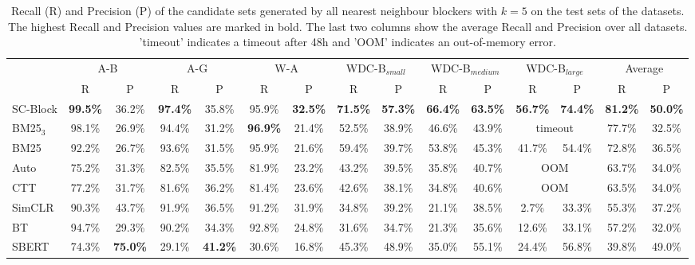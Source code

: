 \documentclass[sigconf,nonacm]{acmart}
\begin{document}
\begin{table*}[]
\caption{Recall (R) and Precision (P) of the candidate sets generated by all nearest neighbour blockers with $k=5$ on the test sets of the datasets. The highest Recall and Precision values are marked in bold. The last two columns show the average Recall and Precision over all datasets. 'timeout' indicates a timeout after 48h and 'OOM' indicates an out-of-memory error.}
\label{tab:nns_fixed_k}
\begin{tabular}{@{}l|cc|cc|cc|cc|cc|cc|cc@{}}
\toprule
  &  \multicolumn{2}{c}{A-B}  &  \multicolumn{2}{c}{A-G}  &  \multicolumn{2}{c}{W-A}  &  \multicolumn{2}{c}{WDC-B$_{small}$}  & \multicolumn{2}{c}{WDC-B$_{medium}$}  & \multicolumn{2}{c}{WDC-B$_{large}$}  &   \multicolumn{2}{c}{Average}\\ 
              &  R      &  P     &  R      &  P     &  R      &  P      &  R      &  P      &  R  &   P &  R  &   P &  R  &   P \\ \midrule
SC-Block & \textbf{99.5\%} & 36.2\% & \textbf{97.4\%} & 35.8\% & 95.9\% & \textbf{32.5\%} & \textbf{71.5\%} & \textbf{57.3\%} & \textbf{66.4\%} & \textbf{63.5\%} & \textbf{56.7\%} & \textbf{74.4\%} & \textbf{81.2\%} & \textbf{50.0\%} \\
BM25$_3$  & 98.1\% & 26.9\% & 94.4\% & 31.2\% & \textbf{96.9\%} & 21.4\% & 52.5\% & 38.9\% & 46.6\% & 43.9\% & \multicolumn{2}{c|}{timeout}   & 77.7\% & 32.5\% \\
BM25     & 92.2\% & 26.7\% & 93.6\% & 31.5\% & 95.9\% & 21.6\% & 59.4\% & 39.7\% & 53.8\% & 45.3\% & 41.7\%               & 54.4\%                  & 72.8\% & 36.5\% \\
Auto     & 75.2\% & 31.3\% & 82.5\% & 35.5\% & 81.9\% & 23.2\% & 43.2\% & 39.5\% & 35.8\% & 40.7\% & \multicolumn{2}{c|}{OOM} & 63.7\% & 34.0\% \\
CTT      & 77.2\% & 31.7\% & 81.6\% & 36.2\% & 81.4\% & 23.6\% & 42.6\% & 38.1\% & 34.8\% & 40.6\% & \multicolumn{2}{c|}{OOM} & 63.5\% & 34.0\% \\
SimCLR   & 90.3\% & 43.7\% & 91.9\% & 36.5\% & 91.2\% & 31.9\% & 34.8\% & 39.2\% & 21.1\% & 38.5\% & 2.7\%                & 33.3\%                  & 55.3\% & 37.2\% \\
BT       & 94.7\% & 29.3\% & 90.2\% & 34.3\% & 92.8\% & 24.8\% & 31.6\% & 34.7\% & 21.3\% & 35.6\% & 12.6\%               & 33.1\%                  & 57.2\% & 32.0\% \\
SBERT    & 74.3\% & \textbf{75.0\%} & 29.1\% & \textbf{41.2\%} & 30.6\% & 16.8\% & 45.3\% & 48.9\% & 35.0\% & 55.1\% & 24.4\%               & 56.8\%                  & 39.8\% & 49.0\% \\ 
\bottomrule
\end{tabular}
\end{table*}
\end{document}
